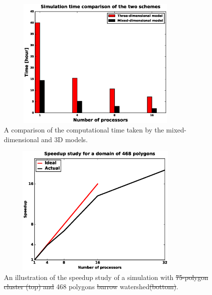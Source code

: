\documentclass[review,11pt]{elsarticle}
\providecommand{\DIFdel}[1]{{\protect\color{red}\sout{#1}}}                      %
\providecommand{\DIFdelFL}[1]{\DIFdel{#1}} %
\providecommand{\DIFdelbeginFL}{} %
\providecommand{\DIFdelendFL}{} %
\begin{document}
\begin{figure}[!htpb]
\centering
\includegraphics[height = 6.5cm, width=10cm]{figures/compare3d-lcs-speed.eps}
\caption{A comparison of the computational time taken by the mixed-dimensional and 3D models.}
\label{3d-lcs-speed}
\end{figure}


\begin{figure}[!htpb]
\centering
\DIFdelbeginFL %
\DIFdelendFL %
\includegraphics[height = 6.5cm, width=10cm]{figures/speedup-lcs-barrow.eps}
\caption{An illustration of the speedup study of a simulation with \DIFdelbeginFL \DIFdelFL{75-polygon cluster (top) and }\DIFdelendFL 468 polygons \DIFdelbeginFL \DIFdelFL{barrow }\DIFdelendFL watershed\DIFdelbeginFL \DIFdelFL{(bottom)}\DIFdelendFL .}
\label{lcs-speed}
\end{figure}
\end{document}
